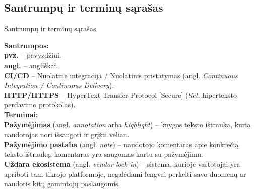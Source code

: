 \begin{center}
    \section*{Santrumpų ir terminų sąrašas}
\end{center}
{Santrumpų ir terminų sąrašas}

\textbf{Santrumpos:} \\
\textbf{pvz.} -- pavyzdžiui. \\
\textbf{angl.} -- angliškai. \\
\textbf{CI/CD} -- Nuolatinė integracija / Nuolatinis pristatymas (angl. \textit{Continuous Integration / Continuous Delivery}). \\
\textbf{HTTP/HTTPS} -- HyperText Transfer Protocol [Secure] (\textit{liet.} hiperteksto perdavimo protokolas). \\




\textbf{Terminai:} \\
\textbf{Pažymėjimas} (angl. \textit{annotation} arba \textit{highlight}) -- knygos teksto ištrauka, kurią naudotojas nori išsaugoti ir grįžti vėliau. \\
\textbf{Pažymėjimo pastaba} (angl. \textit{note}) -- naudotojo komentaras apie konkrečią teksto ištrauką; komentaras yra saugomas kartu su pažymėjimu. \\
\textbf{Uždara ekosistema} (angl. \textit{vendor-lock-in}) -- sistema, kurioje vartotojai yra apriboti tam tikroje platformoje, negalėdami lengvai perkelti savo duomenų ar naudotis kitų gamintojų paslaugomis. \\

\newpage